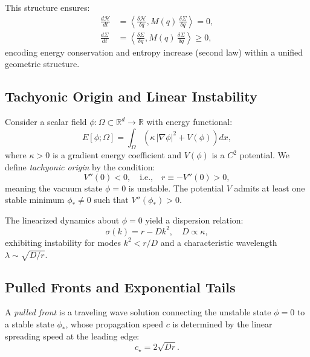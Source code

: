 \documentclass{article}
\begin{document}
This structure ensures:
\begin{align}
\frac{d\mathcal{H}}{dt} &= \left\langle \frac{\delta\mathcal{H}}{\delta q}, M(q)\,\frac{\delta\Sigma}{\delta q} \right\rangle = 0, \label{eq:energy_conservation} \\
\frac{d\Sigma}{dt} &= \left\langle \frac{\delta\Sigma}{\delta q}, M(q)\,\frac{\delta\Sigma}{\delta q} \right\rangle \geq 0, \label{eq:entropy_increase}
\end{align}
encoding energy conservation and entropy increase (second law) within a unified geometric structure.

\subsection*{Tachyonic Origin and Linear Instability}

Consider a scalar field $\phi : \Omega \subset \mathbb{R}^d \to \mathbb{R}$ with energy functional:
\begin{equation}
E[\phi; \Omega] = \int_{\Omega} \left( \kappa\,|\nabla\phi|^2 + V(\phi) \right) dx,
\label{eq:energy_functional}
\end{equation}
where $\kappa > 0$ is a gradient energy coefficient and $V(\phi)$ is a $C^2$ potential. We define \emph{tachyonic origin} by the condition:
\begin{equation}
V''(0) < 0, \quad \text{i.e.,} \quad r \equiv -V''(0) > 0,
\label{eq:tachyonic_condition}
\end{equation}
meaning the vacuum state $\phi = 0$ is unstable. The potential $V$ admits at least one stable minimum $\phi_\ast \neq 0$ such that $V''(\phi_\ast) > 0$.

The linearized dynamics about $\phi = 0$ yield a dispersion relation:
\begin{equation}
\sigma(k) = r - D k^2, \quad D \propto \kappa,
\label{eq:dispersion}
\end{equation}
exhibiting instability for modes $k^2 < r/D$ and a characteristic wavelength $\lambda \sim \sqrt{D/r}$.

\subsection*{Pulled Fronts and Exponential Tails}

A \emph{pulled front} is a traveling wave solution connecting the unstable state $\phi = 0$ to a stable state $\phi_\ast$, whose propagation speed $c$ is determined by the linear spreading speed at the leading edge:
\begin{equation}
c_\star = 2\sqrt{D r}.
\label{eq:front_speed}
\end{equation}
\end{document}

